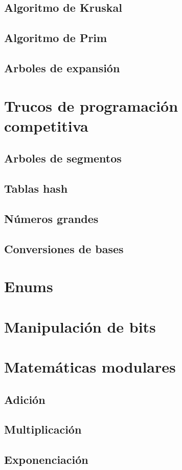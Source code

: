 \documentclass{article}
\begin{document}
\subsection{Algoritmo de Kruskal}

\subsection{Algoritmo de Prim}

\subsection{Arboles de expansión}

\section{Trucos de programación competitiva}

\subsection{Arboles de segmentos}

\subsection{Tablas hash}

\subsection{Números grandes}

\subsection{Conversiones de bases}

\section{Enums}

\section{Manipulación de bits}

\section{Matemáticas modulares}

\subsection{Adición}

\subsection{Multiplicación}

\subsection{Exponenciación}
\end{document}
